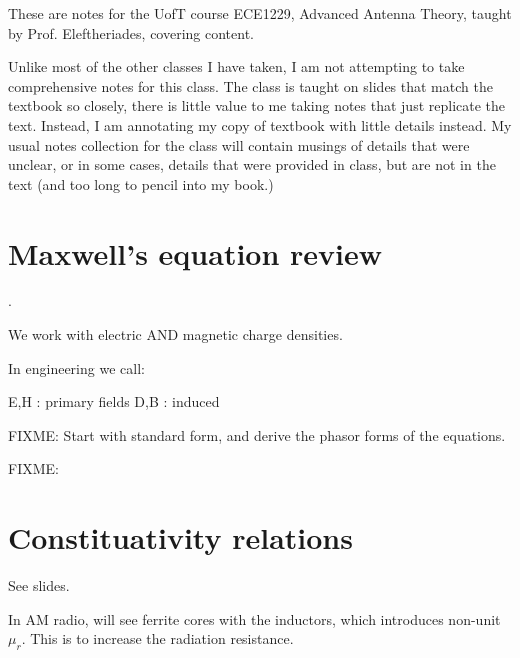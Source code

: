 %
%

\renewcommand{\basename}{chapter3Notes}
\renewcommand{\dirname}{notes/ece1229/}



\usepackage{ece1229}

\beginArtNoToc


These are notes for the UofT course ECE1229, Advanced Antenna Theory, taught by Prof. Eleftheriades, covering  \citep{balanis2005antenna} content.

Unlike most of the other classes I have taken, I am not attempting to take comprehensive notes for this class.  The class is taught on slides that match the textbook so closely, there is little value to me taking notes that just replicate the text.  Instead, I am annotating my copy of textbook with little details instead.  My usual notes collection for the class will contain musings of details that were unclear, or in some cases, details that were provided in class, but are not in the text (and too long to pencil into my book.)

\section{Maxwell's equation review}.

We work with electric AND magnetic charge densities.

In engineering we call:

E,H : primary fields
D,B : induced

FIXME: Start with standard form, and derive the phasor forms of the equations.


FIXME: 
\section{Constituativity relations}

See slides.

In AM radio, will see ferrite cores with the inductors, which introduces non-unit \( \mu_r \).  This is to increase the radiation resistance.

